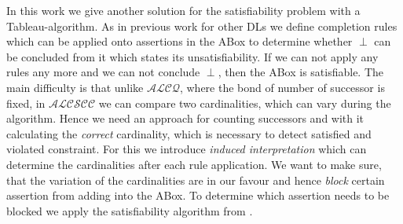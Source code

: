 \documentclass[a4paper,11pt]{scrartcl}
\theoremstyle{break}
\theoremstyle{definition}
\begin{document}
In this work we give another solution for the satisfiability problem with a Tableau-algorithm. As in previous work for other DLs we define completion rules which can be applied onto assertions in the ABox to determine whether $\perp$ can be concluded from it which states its unsatisfiability. If we can not apply any rules any more and we can not conclude $\perp$, then the ABox is satisfiable. The main difficulty is that unlike $\mathcal{ALCQ}$, where the bond of number of successor is fixed, in $\mathcal{ALCSCC}$ we can compare two cardinalities, which can vary during the algorithm. Hence we need an approach for counting successors and with it calculating the \textit{correct} cardinality, which is necessary to detect satisfied and violated constraint. For this we introduce \textit{induced interpretation} which can determine the cardinalities after each rule application. We want to make sure, that the variation of the cardinalities are in our favour and hence \textit{block} certain assertion from adding into the ABox. To determine which assertion needs to be blocked we apply the satisfiability algorithm from \cite{4}.
\end{document}
